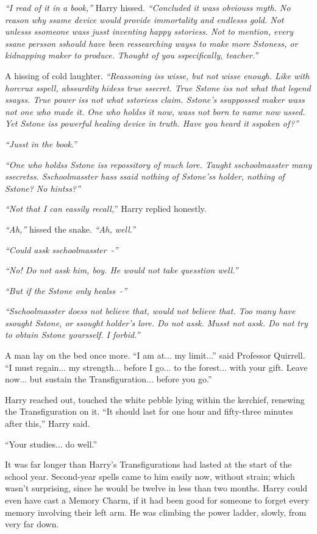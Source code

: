 \emph{``I read of it in a book,''} Harry hissed. \emph{``Concluded it wass obviouss myth. No reason why ssame device would provide immortality and endlesss gold. Not unlesss ssomeone wass jusst inventing happy sstoriess. Not to mention, every ssane persson sshould have been ressearching wayss to make more Sstoness, or kidnapping maker to produce. Thought of you sspecifically, teacher.''}

A hissing of cold laughter. \emph{``Reassoning iss wisse, but not wisse enough. Like with horcrux sspell, abssurdity hidess true ssecret. True Sstone iss not what that legend ssayss. True power iss not what sstoriess claim. Sstone's ssuppossed maker wass not one who made it. One who holdss it now, wass not born to name now ussed. Yet Sstone iss powerful healing device in truth. Have you heard it sspoken of?''}

\emph{``Jusst in the book.}''

\emph{``One who holdss Sstone iss repossitory of much lore. Taught sschoolmasster many ssecretss. Sschoolmasster hass ssaid nothing of Sstone'ss holder, nothing of Sstone? No hintss?''}

\emph{``Not that I can eassily recall,}'' Harry replied honestly.

\emph{``Ah,''} hissed the snake. \emph{``Ah, well.''}

\emph{``Could assk sschoolmasster~-''}

\emph{``No! Do not assk him, boy. He would not take quesstion well.''}

\emph{``But if the Sstone only healss~-''}

\emph{``Sschoolmasster doess not believe that, would not believe that. Too many have ssought Sstone, or ssought holder's lore. Do not assk. Musst not assk. Do not try to obtain Sstone yoursself. I forbid.''}

A man lay on the bed once more. ``I am at... my limit...'' said Professor Quirrell. ``I must regain... my strength... before I go... to the forest... with your gift. Leave now... but sustain the Transfiguration... before you go.''

Harry reached out, touched the white pebble lying within the kerchief, renewing the Transfiguration on it. ``It should last for one hour and fifty-three minutes after this,'' Harry said.

``Your studies... do well.''

It was far longer than Harry's Transfigurations had lasted at the start of the school year. Second-year spells came to him easily now, without strain; which wasn't surprising, since he would be twelve in less than two months. Harry could even have cast a Memory Charm, if it had been good for someone to forget every memory involving their left arm. He was climbing the power ladder, slowly, from very far down.

